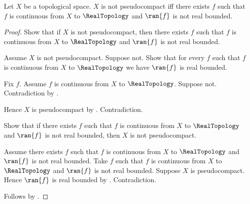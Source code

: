 \begin{theorem}\label{not_pseudocompact_iff_unbounded_continuous_real_map}
    Let $X$ be a topological space.
    $X$ is not pseudocompact iff there exists $f$ such that
        $f$ is continuous from $X$ to $\RealTopology$ and
        $\ran{f}$ is not real bounded.
\end{theorem}
\begin{proof}
    Show that if $X$ is not pseudocompact, then there exists $f$ such that
        $f$ is continuous from $X$ to $\RealTopology$ and
        $\ran{f}$ is not real bounded.
    \begin{subproof}
        Assume $X$ is not pseudocompact.
        Suppose not.
        Show that for every $f$ such that
            $f$ is continuous from $X$ to $\RealTopology$
            we have $\ran{f}$ is real bounded.
        \begin{subproof}
            Fix $f$.
            Assume $f$ is continuous from $X$ to $\RealTopology$.
            Suppose not.
            Contradiction by \auto.
        \end{subproof}
        Hence $X$ is pseudocompact by .
        Contradiction.
    \end{subproof}
    Show that if there exists $f$ such that
        $f$ is continuous from $X$ to $\RealTopology$ and
        $\ran{f}$ is not real bounded, then $X$ is not pseudocompact.
    \begin{subproof}
        Assume there exists $f$ such that
            $f$ is continuous from $X$ to $\RealTopology$ and
            $\ran{f}$ is not real bounded.
        Take $f$ such that
            $f$ is continuous from $X$ to $\RealTopology$ and
            $\ran{f}$ is not real bounded.
        Suppose $X$ is pseudocompact.
        Hence $\ran{f}$ is real bounded by
            .
        Contradiction.
    \end{subproof}
    Follows by \auto.
\end{proof}
